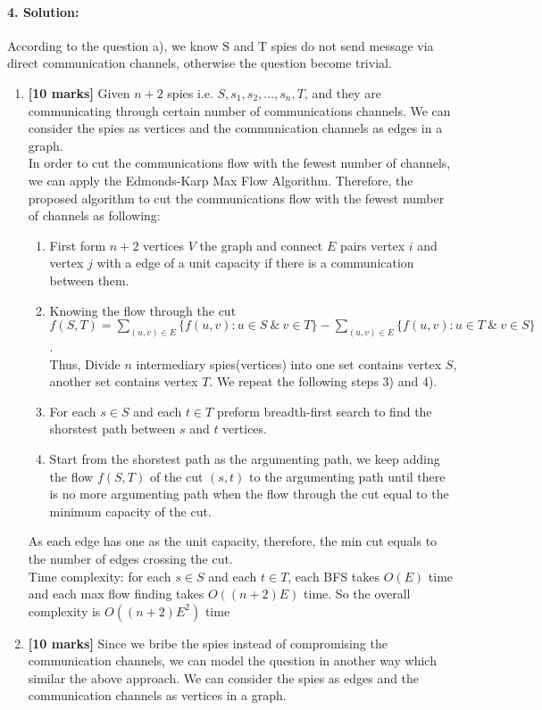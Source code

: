 \documentclass[a4paper]{scrartcl}
\begin{document}
\paragraph{4. Solution:}
\label{sec:Question 4}
According to the question a), we know S and T spies do not send message via direct communication channels, otherwise the question become trivial.
\begin{enumerate}[label=(\alph{*})]
  \item {\bfseries[10 marks]} Given $ n + 2 $ spies i.e. $ S, s_1, s_2, ... , s_n, T$, and they are communicating through certain number of communications channels. We can consider the spies as vertices and the communication channels as edges in a graph.\\
  In order to cut the communications flow with the fewest number of channels, we can apply the Edmonds-Karp Max Flow Algorithm. Therefore, the proposed algorithm to cut the communications flow with the fewest number of channels as following:
  \begin{enumerate}[label=\arabic{*})]
    \item First form $n+2$ vertices $V$ the graph and connect $E$ pairs vertex $i$ and vertex $j$ with a edge of a unit capacity if there is a communication between them.
    \item Knowing the flow through the cut $f(S,T)=\sum_{(u,v) \in E} \{ f(u,v): u \in S\ \&\ v \in T \} - \sum_{(u,v) \in E} \{ f(u,v): u \in T\ \&\ v \in S\}$.\\
    Thus, Divide $n$ intermediary spies(vertices) into one set contains vertex $S$, another set contains vertex $T$. We repeat the following steps 3) and 4).
    \item For each $s \in S$ and each $t \in T$ preform breadth-first search to find the shorstest path between $s$ and $t$ vertices.
    \item Start from the shorstest path as the argumenting path, we keep adding the flow $f(S,T)$ of the cut $(s,t)$ to the argumenting path until there is no more argumenting path when the flow through the cut equal to the minimum capacity of the cut.
  \end{enumerate}
  As each edge has one as the unit capacity, therefore, the min cut equals to the number of edges crossing the cut.\\
  Time complexity: for each $s \in S$ and each $t \in T$, each BFS takes $O(E)$ time and each max flow finding takes $O((n+2)E)$ time. So the overall complexity is $O((n+2)E^2)$ time
  \item {\bfseries[10 marks]} Since we bribe the spies instead of compromising the communication channels, we can model the question in another way which similar the above approach. We can consider the spies as edges and the communication channels as vertices in a graph.\\

\end{enumerate}
\end{document}
